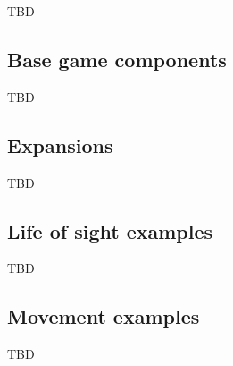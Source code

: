 \label{sec:Appendix}

TBD

\subsection{Base game components}
TBD

\subsection{Expansions}
TBD

\subsection{Life of sight examples}
TBD

\subsection{Movement examples}
TBD